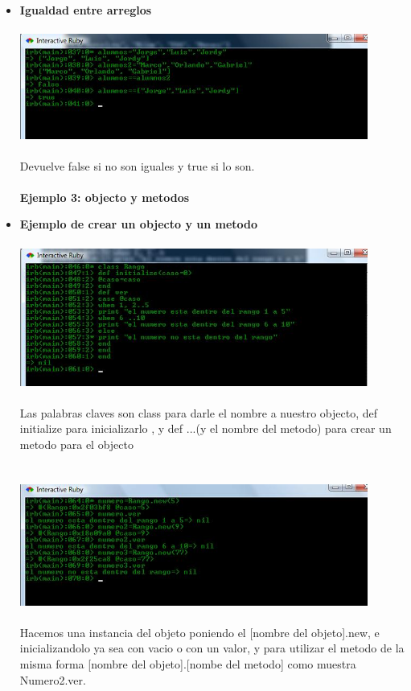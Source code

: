 \documentclass[11pt]{article} %
\begin{document}
\begin{itemize}
    \item {\bf Igualdad entre arreglos}\\\\
	    \includegraphics[width=0.9\textwidth]{./imagenes/igualdad_entre_arreglos}\\\\
Devuelve false si no son iguales y true si lo son.\\\\

 {\fontsize{14}{0} \bf Ejemplo 3: objecto y metodos\\}
  \item {\bf Ejemplo de crear un objecto y un metodo}\\\\
	    \includegraphics[width=0.9\textwidth]{./imagenes/crear_objecto}\\\\
Las palabras claves son class para darle el nombre a nuestro objecto,  def  initialize  para inicializarlo , y def ...(y el nombre del metodo) para crear un metodo para el objecto\\
\newpage
  	   \\\\
	    \includegraphics[width=0.9\textwidth]{./imagenes/uso_objecto}\\\\
Hacemos una instancia del objeto poniendo el [nombre del objeto].new, e inicializandolo ya sea con vacio o con un valor, y para utilizar el metodo de la misma forma [nombre del objeto].[nombe del metodo] como muestra Numero2.ver.\\


\end{itemize}
\end{document}
